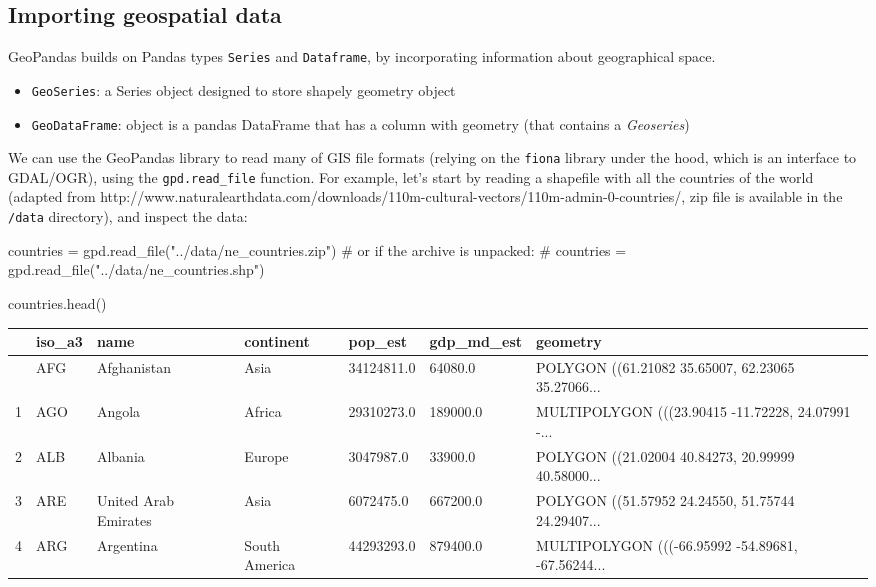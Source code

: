 \documentclass[
  letterpaper,
  DIV=11,
  numbers=noendperiod]{scrreprt}
\newenvironment{Shaded}{\begin{snugshade}}{\end{snugshade}}
\newcommand{\CommentTok}[1]{\textcolor[rgb]{0.37,0.37,0.37}{#1}}
\newcommand{\NormalTok}[1]{\textcolor[rgb]{0.00,0.23,0.31}{#1}}
\newcommand{\OperatorTok}[1]{\textcolor[rgb]{0.37,0.37,0.37}{#1}}
\newcommand{\StringTok}[1]{\textcolor[rgb]{0.13,0.47,0.30}{#1}}
\providecommand{\tightlist}{%
  \setlength{\itemsep}{0pt}\setlength{\parskip}{0pt}}\usepackage{longtable,booktabs,array}
\begin{document}
\subsection{Importing geospatial data}\label{importing-geospatial-data}

GeoPandas builds on Pandas types \texttt{Series} and \texttt{Dataframe},
by incorporating information about geographical space.

\begin{itemize}
\tightlist
\item
  \texttt{GeoSeries}: a Series object designed to store shapely geometry
  object
\item
  \texttt{GeoDataFrame}: object is a pandas DataFrame that has a column
  with geometry (that contains a \emph{Geoseries})
\end{itemize}

We can use the GeoPandas library to read many of GIS file formats
(relying on the \texttt{fiona} library under the hood, which is an
interface to GDAL/OGR), using the \texttt{gpd.read\_file} function. For
example, let's start by reading a shapefile with all the countries of
the world (adapted from
http://www.naturalearthdata.com/downloads/110m-cultural-vectors/110m-admin-0-countries/,
zip file is available in the \texttt{/data} directory), and inspect the
data:

\begin{Shaded}
\begin{Highlighting}[]
\NormalTok{countries }\OperatorTok{=}\NormalTok{ gpd.read\_file(}\StringTok{"../data/ne\_countries.zip"}\NormalTok{)}
\CommentTok{\# or if the archive is unpacked:}
\CommentTok{\# countries = gpd.read\_file("../data/ne\_countries.shp")}
\end{Highlighting}
\end{Shaded}

\begin{Shaded}
\begin{Highlighting}[]
\NormalTok{countries.head()}
\end{Highlighting}
\end{Shaded}

\begin{longtable}[]{@{}lllllll@{}}
\toprule\noalign{}
& iso\_a3 & name & continent & pop\_est & gdp\_md\_est & geometry \\
\midrule\noalign{}
\endhead
\bottomrule\noalign{}
\endlastfoot
0 & AFG & Afghanistan & Asia & 34124811.0 & 64080.0 & POLYGON ((61.21082
35.65007, 62.23065 35.27066... \\
1 & AGO & Angola & Africa & 29310273.0 & 189000.0 & MULTIPOLYGON
(((23.90415 -11.72228, 24.07991 -... \\
2 & ALB & Albania & Europe & 3047987.0 & 33900.0 & POLYGON ((21.02004
40.84273, 20.99999 40.58000... \\
3 & ARE & United Arab Emirates & Asia & 6072475.0 & 667200.0 & POLYGON
((51.57952 24.24550, 51.75744 24.29407... \\
4 & ARG & Argentina & South America & 44293293.0 & 879400.0 &
MULTIPOLYGON (((-66.95992 -54.89681, -67.56244... \\
\end{longtable}
\end{document}
